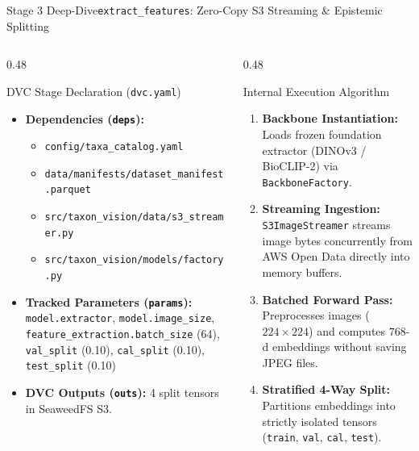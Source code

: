 \begin{frame}{Stage 3 Deep-Dive}{\texttt{extract\_features}: Zero-Copy S3 Streaming \& Epistemic Splitting}
\begin{columns}[T]
\begin{column}{0.48\textwidth}
\begin{block}{DVC Stage Declaration (\texttt{dvc.yaml})}
\begin{itemize}
                    \item \textbf{Dependencies (\texttt{deps}):}
                        \begin{itemize}\tiny
                            \item \texttt{config/taxa\_catalog.yaml}
                            \item \texttt{data/manifests/dataset\_manifest.parquet}
                            \item \texttt{src/taxon\_vision/data/s3\_streamer.py}
                            \item \texttt{src/taxon\_vision/models/factory.py}
                        \end{itemize}
                    \item \textbf{Tracked Parameters (\texttt{params}):}
                        \texttt{model.extractor}, \texttt{model.image\_size}, \newline
                        \texttt{feature\_extraction.batch\_size} (64), \newline
                        \texttt{val\_split} (0.10), \texttt{cal\_split} (0.10), \newline
                        \texttt{test\_split} (0.10)
                    \item \textbf{DVC Outputs (\texttt{outs}):}
                        4 split tensors in SeaweedFS S3.
                \end{itemize}
            \end{block}
        \end{column}
        \begin{column}{0.48\textwidth}
            \begin{block}{Internal Execution Algorithm}
                \begin{enumerate}\scriptsize
                    \item \textbf{Backbone Instantiation:} Loads frozen foundation extractor (DINOv3 / BioCLIP-2) via \texttt{BackboneFactory}.
                    \item \textbf{Streaming Ingestion:} \texttt{S3ImageStreamer} streams image bytes concurrently from AWS Open Data directly into memory buffers.
                    \item \textbf{Batched Forward Pass:} Preprocesses images ($224 \times 224$) and computes 768-d embeddings without saving JPEG files.
                    \item \textbf{Stratified 4-Way Split:} Partitions embeddings into strictly isolated tensors (\texttt{train}, \texttt{val}, \texttt{cal}, \texttt{test}).
                \end{enumerate}
            \end{block}
        \end{column}
    \end{columns}



\end{frame}
